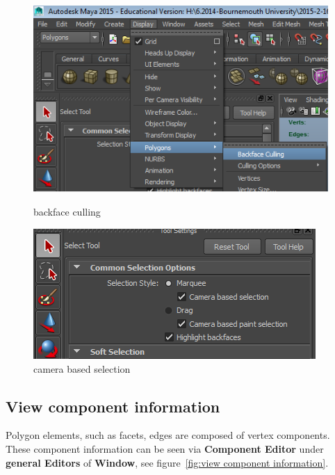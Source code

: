 \begin{figure}[htb]
	\centering
	\begin{minipage}[b]{0.45\textwidth}
		\includegraphics[width=\textwidth]{"figures/backface culling"}
		\caption{backface culling}\label{fig: backface culling}
	\end{minipage}
	\begin{minipage}[b]{0.45\textwidth}
		\centering
		\includegraphics[width=\textwidth]{"figures/camera based selection"}
		\caption{camera based selection}\label{fig:camera based selection}
	\end{minipage}
	\vspace{\baselineskip}
\end{figure}

\subsection{View component information}
Polygon elements, such as facets, edges are composed of vertex components. These component information can be seen via \textbf{Component Editor} under \textbf{general Editors} of \textbf{Window}, see figure~\ref{fig:view component information}.

